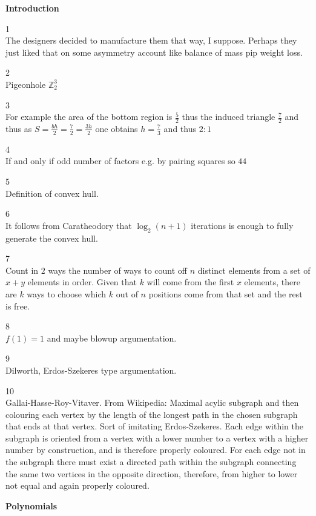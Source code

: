 \twocolumn

\textbf{Introduction}

1 \\
The designers decided to manufacture them that way, I suppose. Perhaps they just liked that on some asymmetry account like balance of mass pip weight loss.

2 \\
Pigeonhole $\mathbb{Z}_2^3$

3 \\
For example the area of the bottom region is $\frac{5}{2}$ thus the induced triangle $\frac{7}{2}$ and thus as $S=\frac{bh}{2}=\frac{7}{2}=\frac{3h}{2}$ one obtains $h=\frac{7}{3}$ and thus $\boxed{2:1}$

4 \\
If and only if odd number of factors e.g. by pairing squares so $\boxed{44}$

5 \\
Definition of convex hull.

6 \\
It follows from Caratheodory that $\log_2(n+1)$ iterations is enough to fully generate the convex hull.

7 \\
Count in $2$ ways the number of ways to count off $n$ distinct elements from a set of $x+y$ elements in order. Given that $k$ will come from the first $x$ elements, there are $k$ ways to choose which $k$ out of $n$ positions come from that set and the rest is free.

8 \\
$f(1)=1$ and maybe blowup argumentation.

9 \\
Dilworth, Erdos-Szekeres type argumentation.

10 \\
Gallai-Hasse-Roy-Vitaver. From Wikipedia: Maximal acylic subgraph and then colouring each vertex by the length of the longest path in the chosen subgraph that ends at that vertex. Sort of imitating Erdos-Szekeres. Each edge within the subgraph is oriented from a vertex with a lower number to a vertex with a higher number by construction, and is therefore properly coloured. For each edge not in the subgraph there must exist a directed path within the subgraph connecting the same two vertices in the opposite direction, therefore, from higher to lower not equal and again properly coloured.

\newpage

\textbf{Polynomials}

